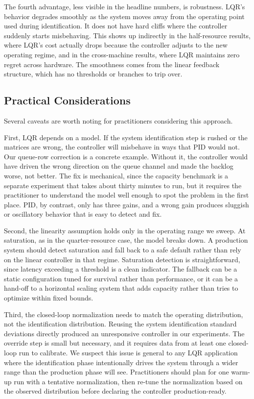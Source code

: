 \documentclass[10pt,a4paper]{article}
\begin{document}
The fourth advantage, less visible in the headline numbers, is robustness. LQR's behavior degrades smoothly as the system moves away from the operating point used during identification. It does not have hard cliffs where the controller suddenly starts misbehaving. This shows up indirectly in the half-resource results, where LQR's cost actually drops because the controller adjusts to the new operating regime, and in the cross-machine results, where LQR maintains zero regret across hardware. The smoothness comes from the linear feedback structure, which has no thresholds or branches to trip over.

\subsection{Practical Considerations}

Several caveats are worth noting for practitioners considering this approach.

First, LQR depends on a model. If the system identification step is rushed or the matrices are wrong, the controller will misbehave in ways that PID would not. Our queue-row correction is a concrete example. Without it, the controller would have driven the wrong direction on the queue channel and made the backlog worse, not better. The fix is mechanical, since the capacity benchmark is a separate experiment that takes about thirty minutes to run, but it requires the practitioner to understand the model well enough to spot the problem in the first place. PID, by contrast, only has three gains, and a wrong gain produces sluggish or oscillatory behavior that is easy to detect and fix.

Second, the linearity assumption holds only in the operating range we sweep. At saturation, as in the quarter-resource case, the model breaks down. A production system should detect saturation and fall back to a safe default rather than rely on the linear controller in that regime. Saturation detection is straightforward, since latency exceeding a threshold is a clean indicator. The fallback can be a static configuration tuned for survival rather than performance, or it can be a hand-off to a horizontal scaling system that adds capacity rather than tries to optimize within fixed bounds.

Third, the closed-loop normalization needs to match the operating distribution, not the identification distribution. Reusing the system identification standard deviations directly produced an unresponsive controller in our experiments. The override step is small but necessary, and it requires data from at least one closed-loop run to calibrate. We suspect this issue is general to any LQR application where the identification phase intentionally drives the system through a wider range than the production phase will see. Practitioners should plan for one warm-up run with a tentative normalization, then re-tune the normalization based on the observed distribution before declaring the controller production-ready.
\end{document}
